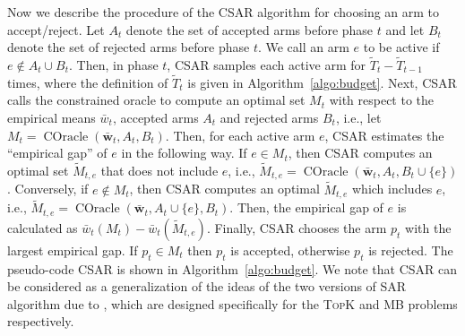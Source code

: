 \documentclass{article}
\newcommand{\AlgorithmBud}{{\small \textsf{CSAR}}\xspace}
\DeclareMathOperator{\COracle}{COracle}
\newcommand{\MultiIdent}{\textsc{TopK}\xspace}
\newcommand{\MultiBandit}{\textsc{MB}\xspace}
\renewcommand{\vec}[1]{\boldsymbol{#1}}
\begin{document}
Now we describe the procedure of the \AlgorithmBud algorithm for choosing an arm to accept/reject.
Let $A_t$ denote the set of accepted arms before phase $t$ and let $B_t$ denote the set of rejected arms before phase $t$.
We call an arm $e$ to be active if $e\not\in A_t\cup B_t$.
Then, in phase $t$, \AlgorithmBud samples each active arm for $\tilde T_t -\tilde T_{t-1}$ times, where the definition of $\tilde T_t$ is given in Algorithm~\ref{algo:budget}.
Next, \AlgorithmBud calls the constrained oracle to compute an optimal set $M_t$ with respect to the empirical means $\bar w_t$, accepted arms $A_t$ and rejected arms $B_t$, i.e., let $M_t = \COracle(\vec {\bar w}_t, A_t,B_t)$.
Then, for each active arm $e$, \AlgorithmBud estimates the ``empirical gap'' of $e$ in the following way.
If $e\in M_t$, then \AlgorithmBud computes an optimal set $\tilde M_{t,e}$ that does not include $e$, i.e., $\tilde M_{t,e} = \COracle(\vec {\bar w}_t, A_t, B_t \cup \{e\})$.
Conversely, if $e\not\in M_t$, then \AlgorithmBud computes an optimal $\tilde M_{t,e}$ which includes $e$, i.e., $\tilde M_{t,e} = \COracle(\vec {\bar w}_t, A_t \cup \{e\}, B_t)$.
Then, the empirical gap of $e$ is calculated as $\bar w_t(M_t)-\bar w_t(\tilde M_{t,e})$.
Finally, \AlgorithmBud chooses the  arm $p_t$ with the largest empirical gap.
If $p_t\in M_t$ then $p_t$ is accepted, otherwise $p_t$ is rejected.
The pseudo-code \AlgorithmBud is shown in Algorithm~\ref{algo:budget}.
We note that \AlgorithmBud can be considered as a generalization of the ideas of the two versions of SAR algorithm due to \citet{bubeck2013multiple}, which are designed specifically for the \MultiIdent and \MultiBandit problems respectively.
\end{document}
